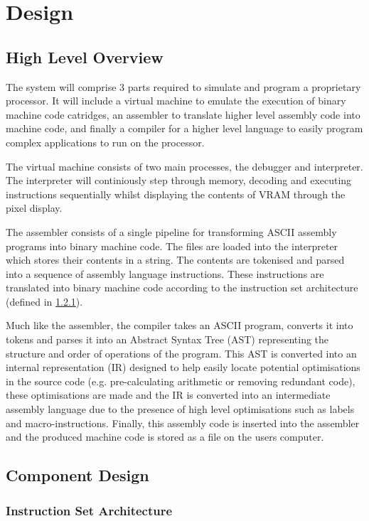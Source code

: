 \section{Design}

\subsection{High Level Overview}

The system will comprise 3 parts required to simulate and program a proprietary processor. It will include a virtual machine to emulate the execution of binary machine code catridges, an assembler to translate higher level assembly code into machine code, and finally a compiler for a higher level language to easily program complex applications to run on the processor.

The virtual machine consists of two main processes, the debugger and interpreter. The interpreter will continiously step through memory, decoding and executing instructions sequentially whilst displaying the contents of VRAM through the pixel display.


\bigskip

The assembler consists of a single pipeline for transforming ASCII assembly programs into binary machine code. The files are loaded into the interpreter which stores their contents in a string. The contents are tokenised and parsed into a sequence of assembly language instructions. These instructions are translated into binary machine code according to the instruction set architecture (defined in \ref{sec:ISADesign}).

\bigskip


\bigskip

Much like the assembler, the compiler takes an ASCII program, converts it into tokens and parses it into an Abstract Syntax Tree (AST) representing the structure and order of operations of the program. This AST is converted into an internal representation (IR) designed to help easily locate potential optimisations in the source code (e.g. pre-calculating arithmetic or removing redundant code), these optimisations are made and the IR is converted into an intermediate assembly language due to the presence of high level optimisations such as labels and macro-instructions. Finally, this assembly code is inserted into the assembler and the produced machine code is stored as a file on the users computer. 

\bigskip


\subsection{Component Design}
\subsubsection{Instruction Set Architecture}
\label{sec:ISADesign}